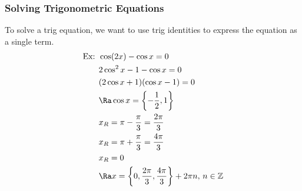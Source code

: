 \subsubsection{Solving Trigonometric Equations}
To solve a trig equation, we want to use trig identities to express the equation as a single term.\\
\begin{align*}
    \text{Ex: }&\cos(2x)-\cos x=0\\
    &2\cos^2x-1-\cos x=0\\
    &(2\cos x+1)(\cos x-1)=0\\
    &\Ra\cos x=\left\{-\frac{1}{2},1\right\}\\
    &x_R=\pi-\frac{\pi}{3}=\frac{2\pi}{3}\\
    &x_R=\pi+\frac{\pi}{3}=\frac{4\pi}{3}\\
    &x_R=0\\
    &\Ra x=\left\{0,\frac{2\pi}{3},\frac{4\pi}{3}\right\}+2\pi n,\,n\in\mathbb{Z}
\end{align*}

